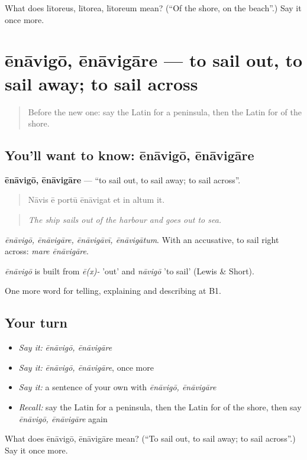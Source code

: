 \begin{tcolorbox}[breakable,colback=teal!4,colframe=teal!35!black,title={Before you move on}]
What does lītoreus, lītorea, lītoreum mean? (\textquotedblleft{}Of the shore, on the beach\textquotedblright{}.) Say it once more.
\end{tcolorbox}
\section[ēnāvigō, ēnāvigāre]{ēnāvigō, ēnāvigāre — to sail out, to sail away; to sail across}

\label{lesson:LA-C444-enavigo}



\begin{quote}
Before the new one: say the Latin for a peninsula, then the Latin for of the shore.
\end{quote}

\subsection*{You'll want to know: ēnāvigō, ēnāvigāre}
\textbf{ēnāvigō, ēnāvigāre} — \textquotedblleft{}to sail out, to sail away; to sail across\textquotedblright{}.

\begin{quote}
Nāvis ē portū ēnāvigat et in altum it.
\end{quote}

\begin{quote}
\emph{The ship sails out of the harbour and goes out to sea.}
\end{quote}

\emph{ēnāvigō, ēnāvigāre, ēnāvigāvī, ēnāvigātum}. With an accusative, to sail right across: \emph{mare ēnāvigāre}.

\begin{cousinweb}
\emph{ēnāvigō} is built from \emph{ē(x)-} 'out' and \emph{nāvigō} 'to sail' (Lewis \& Short).
\end{cousinweb}

\begin{grammarlens}[title={What you've built}]
One more word for telling, explaining and describing at B1.
\end{grammarlens}

\subsection*{Your turn}
\begin{itemize}
\raggedright
  \item \emph{Say it:} \emph{ēnāvigō, ēnāvigāre}
  \item \emph{Say it:} \emph{ēnāvigō, ēnāvigāre}, once more
  \item \emph{Say it:} a sentence of your own with \emph{ēnāvigō, ēnāvigāre}
  \item \emph{Recall:} say the Latin for a peninsula, then the Latin for of the shore, then say \emph{ēnāvigō, ēnāvigāre} again
\end{itemize}

\begin{tcolorbox}[breakable,colback=teal!4,colframe=teal!35!black,title={Before you move on}]
What does ēnāvigō, ēnāvigāre mean? (\textquotedblleft{}To sail out, to sail away; to sail across\textquotedblright{}.) Say it once more.
\end{tcolorbox}
